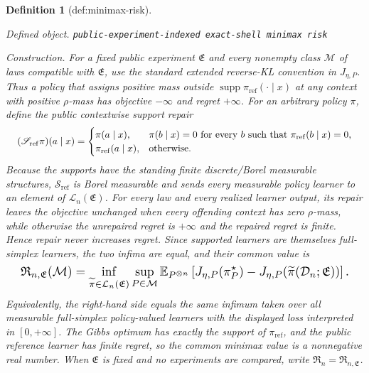 \documentclass{article}
\newtheorem{definition}{Definition}
\begin{document}
\begin{definition}[def:minimax-risk]\label{def:minimax-risk}
\par\smallskip\noindent\emph{Defined object.} \texttt{public-\allowbreak{}experiment-\allowbreak{}indexed exact-\allowbreak{}shell minimax risk}
\par\smallskip\noindent\emph{Construction.} For a fixed public experiment \(\mathfrak E\) and every nonempty class \(\mathcal M\) of laws compatible with \(\mathfrak E\), use the standard extended reverse-KL convention in \(J_{\eta,P}\). Thus a policy that assigns positive mass outside \(\operatorname{supp}\pi_{\mathrm{ref}}(\cdot\mid x)\) at any context with positive \(\rho\)-mass has objective \(-\infty\) and regret \(+\infty\). For an arbitrary policy \(\pi\), define the public contextwise support repair
\[
\makebox[\linewidth][c]{\resizebox{0.98\linewidth}{!}{\(\displaystyle (\mathscr S_{\mathrm{ref}}\pi)(a\mid x)=
\begin{cases}
\pi(a\mid x),&\pi(b\mid x)=0\text{ for every }b\text{ such that }\pi_{\mathrm{ref}}(b\mid x)=0,\\
\pi_{\mathrm{ref}}(a\mid x),&\text{otherwise.}
\end{cases}\)}}
\]
Because the supports have the standing finite discrete/Borel measurable structures, \(\mathscr S_{\mathrm{ref}}\) is Borel measurable and sends every measurable policy learner to an element of \(\mathcal L_n(\mathfrak E)\). For every law and every realized learner output, its repair leaves the objective unchanged when every offending context has zero \(\rho\)-mass, while otherwise the unrepaired regret is \(+\infty\) and the repaired regret is finite. Hence repair never increases regret. Since supported learners are themselves full-simplex learners, the two infima are equal, and their common value is
\[
\makebox[\linewidth][c]{\resizebox{0.98\linewidth}{!}{\par\noindent \makebox[\linewidth][c]{\resizebox{0.98\linewidth}{!}{\(\displaystyle \displaystyle \mathfrak R_{n,\mathfrak E}(\mathcal M)=\inf_{\widetilde\pi\in\mathcal L_n(\mathfrak E)}\sup_{P\in\mathcal M}\mathbb E_{P^{\otimes n}}\left[J_{\eta,P}(\pi_P^\star)-J_{\eta,P}(\widetilde\pi(\mathcal D_n;\mathfrak E))\right].\)}}\par\noindent}}
\]
Equivalently, the right-hand side equals the same infimum taken over all measurable full-simplex policy-valued learners with the displayed loss interpreted in \([0,+\infty]\). The Gibbs optimum has exactly the support of \(\pi_{\mathrm{ref}}\), and the public reference learner has finite regret, so the common minimax value is a nonnegative real number. When \(\mathfrak E\) is fixed and no experiments are compared, write \(\mathfrak R_n=\mathfrak R_{n,\mathfrak E}\).

\end{definition}
\end{document}
